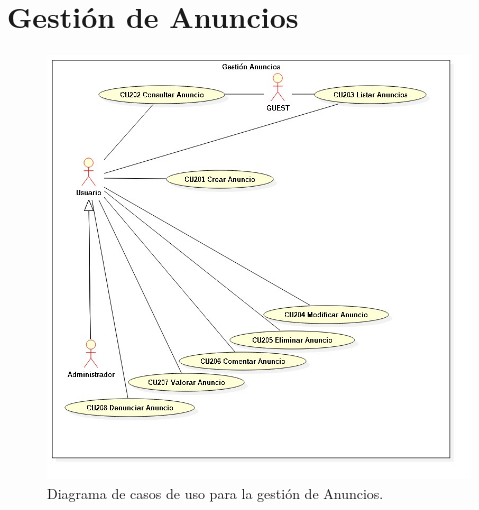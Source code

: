 \section{Gesti\'{o}n de Anuncios}
\begin{figure}[h]
\centering
\includegraphics[width=1\textwidth]{Img/CasosDeUso/DCU02.jpg}
\caption{Diagrama de casos de uso para la gesti\'{o}n de Anuncios.}
\label{fig:dcu}
\end{figure}
